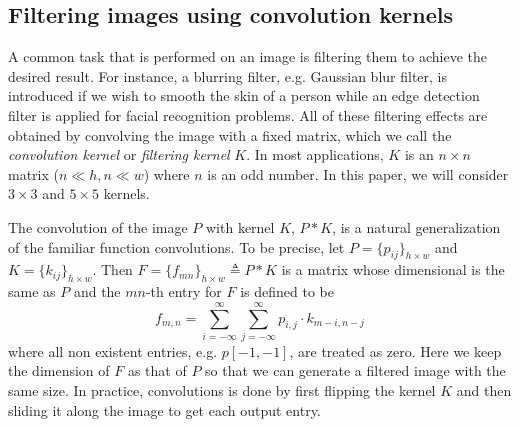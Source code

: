 \documentclass[12pt]{amsart}
\theoremstyle{definition}
\theoremstyle{remark}
\numberwithin{thm}{section}
\begin{document}
\subsection{Filtering images using convolution kernels}
A common task that is performed on an image is filtering them to achieve the desired result. For instance, a blurring filter, e.g. Gaussian blur filter, is introduced if we wish to smooth the skin of a person while an edge detection filter is applied for facial recognition problems. All of these filtering effects are obtained by convolving the image with a fixed matrix, which we call the \emph{convolution kernel} or \emph{filtering kernel} $K$. In most applications, $K$ is an $n\times n$ matrix ($n\ll h, n\ll w$) where $n$ is an odd number. In this paper, we will consider $3\times 3$ and $5 \times 5$ kernels.

The convolution of the image $P$ with kernel $K$, $P*K$, is a natural generalization of the familiar function convolutions. To be precise, let $P=\{p_{ij}\}_{h\times w}$ and $K=\{k_{ij}\}_{h\times w}$. Then $F=\{f_{mn}\}_{h\times w}\triangleq P*K$ is a matrix whose dimensional is the same as $P$ and the $mn$-th entry for $F$ is defined to be 
\[f_{m,n}=\sum_{i=-\infty}^{\infty}\sum_{j=-\infty}^{\infty}p_{i,j}\cdot k_{m-i,n-j}\]
where all non existent entries, e.g. $p[-1,-1]$, are treated as zero. Here we keep the dimension of $F$ as that of $P$ so that we can generate a filtered image with the same size. In practice, convolutions is done by first flipping the kernel $K$ and then sliding it along the image to get each output entry. 
\end{document}
